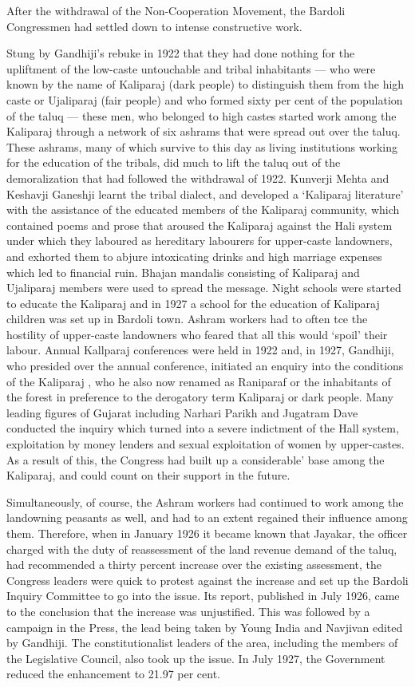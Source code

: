 \begin{multicols}{2}
After the withdrawal of the Non-Cooperation Movement, the Bardoli Congressmen had settled down to intense constructive work.

Stung by Gandhiji's rebuke in 1922 that they had done nothing for the upliftment of the low-caste untouchable and tribal inhabitants --- who were known by the name of Kaliparaj (dark people) to distinguish them from the high caste or Ujaliparaj (fair people) and who formed sixty per cent of the population of the taluq --- these men, who belonged to high castes started work among the Kaliparaj through a network of six ashrams that were spread out over the taluq. These ashrams, many of which survive to this day as living institutions working for the education of the tribals, did much to lift the taluq out of the demoralization that had followed the withdrawal of 1922. Kunverji Mehta and Keshavji Ganeshji learnt the tribal dialect, and developed a `Kaliparaj literature' with the assistance of the educated members of the Kaliparaj community, which contained poems and prose that aroused the Kaliparaj against the Hali system under which they laboured as hereditary labourers for upper-caste landowners, and exhorted them to abjure intoxicating drinks and high marriage expenses which led to financial ruin. Bhajan mandalis consisting of Kaliparaj and Ujaliparaj members were used to spread the message. Night schools were started to educate the Kaliparaj and in 1927 a school for the education of Kaliparaj children was set up in Bardoli town. Ashram workers had to often tce the hostility of upper-caste landowners who feared that all this would `spoil' their labour. Annual Kallparaj conferences were held in 1922 and, in 1927, Gandhiji, who presided over the annual conference, initiated an enquiry into the conditions of the Kaliparaj , who he also now renamed as Raniparaf or the inhabitants of the forest in preference to the derogatory term Kaliparaj or dark people. Many leading figures of Gujarat including Narhari Parikh and Jugatram Dave conducted the inquiry which turned into a severe indictment of the Hall system, exploitation by money lenders and sexual exploitation of women by upper-castes. As a result of this, the Congress had built up a considerable' base among the Kaliparaj, and could count on their support in the future.

Simultaneously, of course, the Ashram workers had continued to work among the landowning peasants as well, and had to an extent regained their influence among them. Therefore, when in January 1926 it became known that Jayakar, the officer charged with the duty of reassessment of the land revenue demand of the taluq, had recommended a thirty percent increase over the existing assessment, the Congress leaders were quick to protest against the increase and set up the Bardoli Inquiry Committee to go into the issue. Its report, published in July 1926, came to the conclusion that the increase was unjustified. This was followed by a campaign in the Press, the lead being taken by Young India and Navjivan edited by Gandhiji. The constitutionalist leaders of the area, including the members of the Legislative Council, also took up the issue. In July 1927, the Government reduced the enhancement to 21.97 per cent.


\end{multicols}
